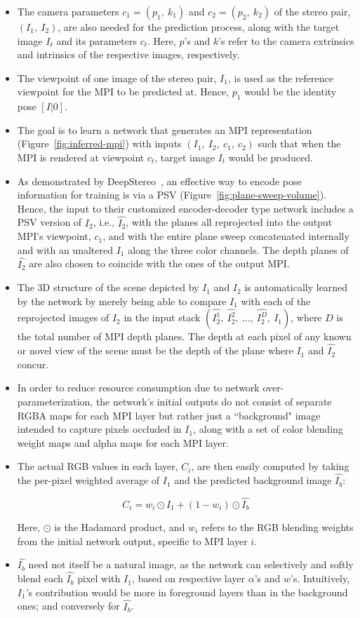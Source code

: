 \begin{itemize}
    \item The camera parameters $c_1 = (p_1,\ k_1)$ and $c_2 = (p_2,\ k_2)$ of the stereo pair, $(I_1,\ I_2)$, are also needed for the prediction process, along with the target image $I_t$ and its parameters $c_t$. Here, $p$'s and $k$'s refer to the camera extrinsics and intrinsics of the respective images, respectively.
    \item The viewpoint of one image of the stereo pair, $I_1$, is used as the reference viewpoint for the MPI to be predicted at. Hence, $p_1$ would be the identity pose $[I|\boldsymbol{\mathit{0}}]$.
    \item The goal is to learn a network that generates an MPI representation (Figure~\ref{fig:inferred-mpi}) with inputs $(I_1,\ I_2,\ c_1,\ c_2)$ such that when the MPI is rendered at viewpoint $c_t$, target image $I_t$ would be produced. 
    \item As demonstrated by DeepStereo~\cite{deep_stereo_2016}, an effective way to encode pose information for training is via a PSV (Figure~\ref{fig:plane-sweep-volume}). Hence, the input to their customized encoder-decoder type network includes a PSV version of $I_2$, i.e., $\hat{I_2}$, with the planes all reprojected into the output MPI's viewpoint, $c_1$, and with the entire plane sweep concatenated internally and with an unaltered $I_1$ along the three color channels. The depth planes of $\hat{I_2}$ are also chosen to coincide with the ones of the output MPI.
    \item The 3D structure of the scene depicted by $I_1$ and $I_2$ is automatically learned by the network by merely being able to compare $I_1$ with each of the reprojected images of $I_2$ in the input stack $(\hat{I_2^1},\ \hat{I_2^2},\ \ldots,\ \hat{I_2^D},\  I_1)$, where $D$ is the total number of MPI depth planes. The depth at each pixel of any known or novel view of the scene must be the depth of the plane where $I_1$ and $\hat{I_2}$ concur.
    \item In order to reduce resource consumption due to network over-parameterization, the network's initial outputs do not consist of separate RGBA maps for each MPI layer but rather just a ``background" image intended to capture pixels occluded in $I_1$, along with a set of color blending weight maps and alpha maps for each MPI layer.
    \item The actual RGB values in each layer, $C_i$, are then easily computed by taking the per-pixel weighted average of $I_1$ and the predicted background image $\hat{I_b}$:
    
    \[C_i = w_i \odot I_1 + (1 - w_i) \odot \hat{I_b}\]
    
    Here, $\odot$ is the Hadamard product, and $w_i$ refers to the RGB blending weights from the initial network output, specific to MPI layer $i$.
    \item $\hat{I_b}$ need not itself be a natural image, as the network can selectively and softly blend each $\hat{I_b}$ pixel with $I_1$, based on respective layer $\alpha$'s and $w$'s. Intuitively, $I_1$'s contribution would be more in foreground layers than in the background ones; and conversely for $\hat{I_b}$. 
\end{itemize}

